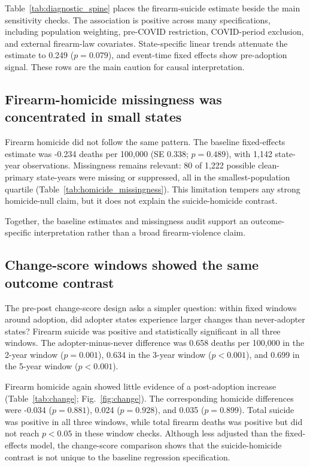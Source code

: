 \documentclass[11pt]{article}
\begin{document}
Table~\ref{tab:diagnostic_spine} places the firearm-suicide estimate beside the main sensitivity checks. The association is positive across many specifications, including population weighting, pre-COVID restriction, COVID-period exclusion, and external firearm-law covariates. State-specific linear trends attenuate the estimate to 0.249 ($p=0.079$), and event-time fixed effects show pre-adoption signal. These rows are the main caution for causal interpretation.



\subsection*{Firearm-homicide missingness was concentrated in small states}

Firearm homicide did not follow the same pattern. The baseline fixed-effects estimate was -0.234 deaths per 100,000 (SE 0.338; $p=0.489$), with 1,142 state-year observations. Missingness remains relevant: 80 of 1,222 possible clean-primary state-years were missing or suppressed, all in the smallest-population quartile (Table~\ref{tab:homicide_missingness}). This limitation tempers any strong homicide-null claim, but it does not explain the suicide-homicide contrast.



Together, the baseline estimates and missingness audit support an outcome-specific interpretation rather than a broad firearm-violence claim.

\subsection*{Change-score windows showed the same outcome contrast}

The pre-post change-score design asks a simpler question: within fixed windows around adoption, did adopter states experience larger changes than never-adopter states? Firearm suicide was positive and statistically significant in all three windows. The adopter-minus-never difference was 0.658 deaths per 100,000 in the 2-year window ($p=0.001$), 0.634 in the 3-year window ($p<0.001$), and 0.699 in the 5-year window ($p<0.001$).

Firearm homicide again showed little evidence of a post-adoption increase (Table~\ref{tab:change}; Fig.~\ref{fig:change}). The corresponding homicide differences were -0.034 ($p=0.881$), 0.024 ($p=0.928$), and 0.035 ($p=0.899$). Total suicide was positive in all three windows, while total firearm deaths was positive but did not reach $p<0.05$ in these window checks. Although less adjusted than the fixed-effects model, the change-score comparison shows that the suicide-homicide contrast is not unique to the baseline regression specification.
\end{document}
